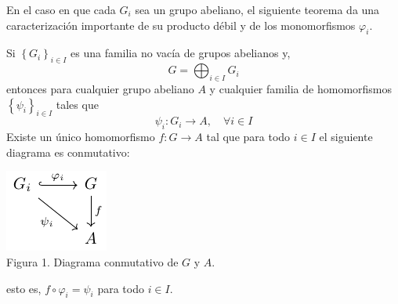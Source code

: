 \documentclass[12pt]{report}
\theoremstyle{largebreak}
\newcommand\cf[3]{\ensuremath{#1:#2\rightarrow#3}}
\begin{document}
    En el caso en que cada $G_i$ sea un grupo abeliano, el siguiente teorema da una caracterización importante de su producto débil y de los monomorfismos $\varphi_i$.

    \begin{theor}
        Si $\left\{G_i \right\}_{ i\in I}$ es una familia no vacía de grupos abelianos y,
        \begin{equation*}
            G=\bigoplus_{ i\in I}G_i
        \end{equation*}
        entonces para cualquier grupo abeliano $A$ y cualquier familia de homomorfismos $\left\{\psi_i\right\}_{ i\in I}$ tales que
        \begin{equation*}
            \cf{\psi_i}{G_i}{A},\quad\forall i\in I
        \end{equation*}
        Existe un único homomorfismo $\cf{f}{G}{A}$ tal que para todo $i\in I$ el siguiente diagrama es conmutativo:

        \begin{minipage}{\textwidth}
            \begin{center}
                \includegraphics[scale=1.5]{images/fig_1.pdf}\\
                Figura 1. Diagrama conmutativo de $G$ y $A$.
            \end{center}
        \end{minipage}

        esto es, $f\circ\varphi_i=\psi_i$ para todo $i\in I$.
    \end{theor}
\end{document}

